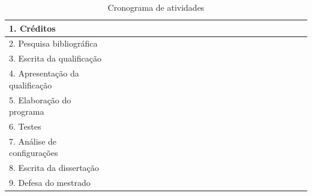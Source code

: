 \documentclass[12pt]{article}
\begin{document}
\begin{table}[H]
\begin{tabular}{|l|c|c|c|c|c|c|c|c|c|c|c|c|c|c|c|c|c|c|c|c|c|c|c|c|}
  1. Créditos                        & \y & \y & \y & \y & \y & \y & \y & \y & \y & \y & \y & \y & \x & \x & \x & \x & \x & \x & \x & \x & \x & \x & \x & \x\\ \hline
  2. Pesquisa bibliográfica          & \y & \y & \y & \y & \y & \y & \y & \y & \y & \y & \y & \y & \y & \y & \y & \y & \y & \y & \y & \y & \y & \y & \y & \x\\ \hline
  3. Escrita da qualificação         & \x & \x & \x & \x & \x & \x & \x & \x & \x & \x & \y & \y & \y & \x & \x & \x & \x & \x & \x & \x & \x & \x & \x & \x\\ \hline
  4. Apresentação da qualificação    & \x & \x & \x & \x & \x & \x & \x & \x & \x & \x & \x & \x & \x & \y & \x & \x & \x & \x & \x & \x & \x & \x & \x & \x\\ \hline
  5. Elaboração do programa 		 & \y & \y & \y & \y & \y & \y & \y & \y & \y & \y & \x & \x & \y & \y & \y & \y & \y & \y & \x & \x & \x & \x & \x & \x\\ \hline
  6. Testes 						 & \x & \x & \x & \x & \x & \x & \x & \x & \x & \x & \x & \x & \x & \x & \x & \x & \y & \y & \x & \x & \x & \x & \x & \x\\ \hline
  7. Análise de configurações		 & \x & \x & \x & \x & \x & \x & \x & \x & \x & \x & \x & \x & \x & \x & \x & \x & \x & \x & \y & \y & \y & \x & \x & \x\\ \hline
  8. Escrita da dissertação          & \x & \x & \x & \x & \x & \x & \x & \x & \x & \x & \x & \x & \x & \x & \x & \x & \x & \x & \x & \x & \x & \y & \y & \y\\ \hline
  9. Defesa do mestrado              & \x & \x & \x & \x & \x & \x & \x & \x & \x & \x & \x & \x & \x & \x & \x & \x & \x & \x & \x & \x & \x & \x & \x & \y\\ \hline
\end{tabular}
 \caption{Cronograma de atividades}
 \label{tab:cronograma}
 \normalsize
\end{table}
\endgroup

\newpage
\end{document}

